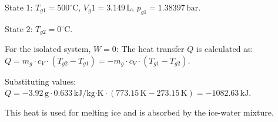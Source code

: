 State 1:  
\( T_{g1} = 500^\circ \text{C}, \, V_g1 = 3.149 \, \text{L}, \, p_{g1} = 1.38397 \, \text{bar} \).  

State 2:  
\( T_{g2} = 0^\circ \text{C} \).  

For the isolated system, \( W = 0 \):  
The heat transfer \( Q \) is calculated as:  
\( Q = m_g \cdot c_V \cdot (T_{g2} - T_{g1}) = -m_g \cdot c_V \cdot (T_{g1} - T_{g2}) \).  

Substituting values:  
\( Q = -3.92 \, \text{g} \cdot 0.633 \, \text{kJ/kg·K} \cdot (773.15 \, \text{K} - 273.15 \, \text{K}) = -1082.63 \, \text{kJ} \).  

This heat is used for melting ice and is absorbed by the ice-water mixture.
